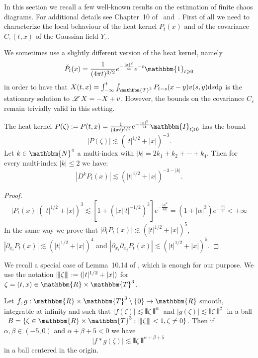 \begin{appendices}
In this section we recall a few well-known results on the estimation of finite
chaos diagrams. For additional details see Chapter~10
of~{\cite{hairer_theory_2014}} and~{\cite{mourrat_construction_2016}}. First
of all we need to characterize the local behaviour of the heat kernel $P_t
(x)$ and of the covariance $C_{\varepsilon} (t, x)$ of the Gaussian field
$Y_{\varepsilon}$.

\begin{remark}
  We sometimes use a slightly different version of the heat kernel, namely
  \[ \check{P}_t (x) = \frac{1}{(4 \mathpi t)^{3 / 2}} e^{- \frac{| x |^2}{4
     t}} e^{- t}  \mathbbm{1}_{t \geqslant 0} \]
  in order to have that $X (t, x) = \int_{- \infty}^t \int_{\mathbbm{T}^3}
  P_{t - s} (x - y) v (s, y) \mathd s \mathd y$ is the stationary solution to
  $\mathscr{L} \hspace{.2em} X = - X + v$. However, the bounds on the covariance $C_{\varepsilon}$
  remain trivially valid in this setting.
\end{remark}

\begin{lemma}
  \label{l:heat-est} The heat kernel $P (\zeta) \assign P (t, x) = \frac{1}{(4
  \mathpi t)^{3 / 2}} e^{- \frac{| x |^2}{4 t}} \mathbbm{I}_{t \geqslant 0}$
  has the bound
  \[ | P (\zeta) | \lesssim (| t |^{1 / 2} + | x |)^{- 3} . \]
  Let $k \in \mathbbm{N}^4$ a multi-index with $| k | = 2 k_1 + k_2 + \cdots +
  k_4$. Then for every multi-index $| k | \leqslant 2$ we have:
  \[ | D^k P_t (x) | \lesssim (| t |^{1 / 2} + | x |)^{- 3 - | k |} . \]
\end{lemma}

\begin{proof}
  
  \[ | P_t (x) | (| t |^{1 / 2} + | x |)^3 \lesssim [1 + (| x | | t |^{- 1 /
     2})^3] e^{- \frac{| x |^2}{4 | t |}} = (1 + | \alpha |^3) e^{- \frac{|
     \alpha |}{4}} < + \infty \]
  In the same way we prove that $| \partial_t P_t (x) | \lesssim (| t |^{1 /
  2} + | x |)^5$, $| \partial_{x_i} P_t (x) | \lesssim (| t |^{1 / 2} + | x
  |)^4$ and $| \partial_{x_i} \partial_{x_j} P_t (x) | \lesssim (| t |^{1 / 2}
  + | x |)^5$.
\end{proof}

We recall a special case of Lemma~10.14 of {\cite{hairer_theory_2014}}, which
is enough for our purpose. We use the notation $\interleave \zeta \interleave
:= (| t |^{1 / 2} + | x |)$ for $\zeta = (t, x) \in \mathbbm{R} \times
\mathbbm{T}^3$.

\begin{lemma}
  \label{l:hom-conv}Let $f, g : \mathbbm{R} \times \mathbbm{T}^3 \setminus
  \{0\} \rightarrow \mathbbm{R}$ smooth, integrable at infinity and such that
  $|f (\zeta) | \lesssim \interleave \zeta \interleave^{\alpha}$ and $|g
  (\zeta) | \lesssim \interleave \zeta \interleave^{\beta}$ in a ball \ $B =
  \{\zeta \in \mathbbm{R} \times \mathbbm{T}^3 : \interleave \zeta \interleave
  < 1, \zeta \neq 0\}$. Then if $\alpha, \beta \in (- 5, 0)$ and $\alpha +
  \beta + 5 < 0$ we have
  \[ |f \ast g (\zeta) | \lesssim \interleave \zeta \interleave^{\alpha +
     \beta + 5} \]
  in a ball centered in the origin.
  

\end{lemma}
\end{appendices}
